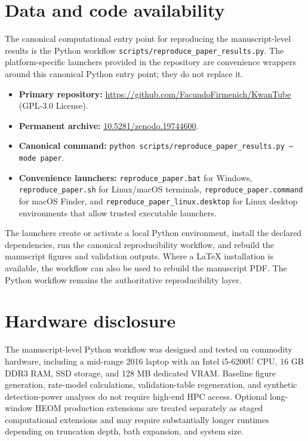 \documentclass[twocolumn,10pt]{article}
\begin{document}
\section*{Data and code availability}

The canonical computational entry point for reproducing the manuscript-level
results is the Python workflow
\texttt{scripts/reproduce\_paper\_results.py}. The platform-specific launchers
provided in the repository are convenience wrappers around this canonical
Python entry point; they do not replace it.

\begin{itemize}
\item \textbf{Primary repository:}
\url{https://github.com/FacundoFirmenich/KwanTube}
(GPL-3.0 License).
\item \textbf{Permanent archive:}
\href{https://doi.org/10.5281/zenodo.19744600}{10.5281/zenodo.19744600}.
\item \textbf{Canonical command:}
\texttt{python scripts/reproduce\_paper\_results.py --mode paper}.
\item \textbf{Convenience launchers:}
\texttt{reproduce\_paper.bat} for Windows,
\texttt{reproduce\_paper.sh} for Linux/macOS terminals,
\texttt{reproduce\_paper.command} for macOS Finder, and
\texttt{reproduce\_paper\_linux.desktop} for Linux desktop environments that
allow trusted executable launchers.
\end{itemize}

The launchers create or activate a local Python environment, install the
declared dependencies, run the canonical reproducibility workflow, and rebuild
the manuscript figures and validation outputs. Where a LaTeX installation is
available, the workflow can also be used to rebuild the manuscript PDF. The
Python workflow remains the authoritative reproducibility layer.

\section*{Hardware disclosure}

The manuscript-level Python workflow was designed and tested on commodity
hardware, including a mid-range 2016 laptop with an Intel i5-6200U CPU,
16 GB DDR3 RAM, SSD storage, and 128 MB dedicated VRAM. Baseline figure
generation, rate-model calculations, validation-table regeneration, and
synthetic detection-power analyses do not require high-end HPC access.
Optional long-window HEOM production extensions are treated separately as
staged computational extensions and may require substantially longer runtimes
depending on truncation depth, bath expansion, and system size.
\end{document}
